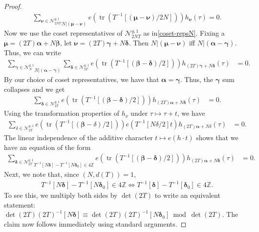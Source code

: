 \documentclass[11pt]{amsart}
\numberwithin{equation}{section}
\newcommand{\mc}{\mathcal}
\DeclareMathOperator{\tr}{tr}
\newcommand{\z}{\mathbb{Z}}
\newcommand{\sumn}{\sum \nolimits}
\begin{document}
\begin{proof}
\begin{align}\label{hnueq}
    \underset{N|(\bm\mu-\bm\nu)}{\sum_{\bm\nu\in \mc N_{2NT}^{g,1}}}e\left(\tr(T^{-1}[(\bm\mu-\bm\nu)/2N])\right) h_{\bm\nu}(\tau)=0.
\end{align}
Now we use the coset representatives of $\mc N_{2NT}^{g,1}$ as in\eqref{coset-repsN}. Fixing a $\bm\mu= (2T)\bm{\alpha}+N\bm{\beta}$, let $\bm\nu= (2T)\bm\gamma+N\bm\delta$. Then $N|(\bm\mu-\bm\nu)$ iff $N|(\bm{\alpha}-\bm\gamma)$. Thus, we can write
\begin{align}
    \underset{N|(\bm{\alpha}-\bm\gamma)}{\sum_{\bm\gamma\in \mc N_{N}^{g,1}}}\sum_{\bm\delta\in \mc N_{2T}^{g,1}}e\left(\tr(T^{-1}[(\bm{\beta}-\bm\delta)/2])\right) h_{(2T)\bm\gamma+N\bm\delta}(\tau)&=0.
\end{align}
By our choice of coset representatives, we have that $\bm{\alpha}=\bm\gamma$. Thus, the $\bm\gamma$ sum collapses and we get
\begin{align}
    \sumn_{\bm\delta\in \mc N_{2T}^{g,1}}e\left(\tr(T^{-1}[(\bm{\beta}-\bm\delta)/2])\right) h_{(2T)\bm{\alpha}+N\bm\delta}(\tau)&=0.
\end{align}
Using the transformation properties of $h_{\nu}$ under $\tau \mapsto \tau+t$, we have
\begin{align}\label{hnu-char}
   \sumn_{\delta\in \mc N_{2T}^{g,1}}e\left(\tr(T^{-1}[(\bm{\beta}-\delta)/2])\right) e(T^{-1}[N\delta/2]t)h_{(2T)\bm{\alpha}+N\delta}(\tau)&=0.
\end{align}
The linear independence of the additive character $t \mapsto e(h \cdot t)$ shows that we have an equation of the form
\begin{align}\label{sqrclass}
   \underset{T^{-1}[N\bm\delta] - T^{-1}[N\bm\delta_0] \in 4 \z }{\sum_{\bm\delta\in \mc N_{2T}^{g,1}} } e\left(\tr(T^{-1}[(\bm\beta-\bm\delta)/2])\right) h_{(2T)\bm{\alpha}+N\bm\delta}(\tau)&=0.
\end{align}
Next, we note that, since $(N, d(T))=1$,  
\begin{align}
T^{-1}[N\bm\delta] - T^{-1}[N\bm\delta_0] \in 4 \z \iff T^{-1}[\bm\delta] - T^{-1}[\bm\delta_0] \in 4 \z .
\end{align}
To see this, we multiply both sides by $\det(2T)$ to write an equivalent statement: $ \det(2T) (2T)^{-1}[N\bm\delta] \equiv \det(2T) (2T)^{-1}[N\bm\delta_0] \bmod{\det(2T)}$. The claim now follows immediately using standard arguments.


\end{proof}
\end{document}
